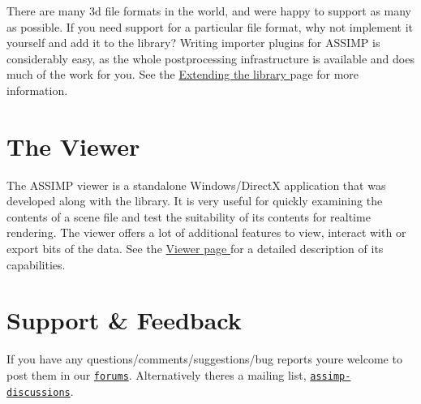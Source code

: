 There are many 3d file formats in the world, and we\textquotesingle{}re happy to support as many as possible. If you need support for a particular file format, why not implement it yourself and add it to the library? Writing importer plugins for A\+S\+S\+I\+M\+P is considerably easy, as the whole postprocessing infrastructure is available and does much of the work for you. See the \hyperlink{extend}{Extending the library } page for more information.\hypertarget{index_main_viewer}{}\section{The Viewer}\label{index_main_viewer}
The A\+S\+S\+I\+M\+P viewer is a standalone Windows/\+Direct\+X application that was developed along with the library. It is very useful for quickly examining the contents of a scene file and test the suitability of its contents for realtime rendering. The viewer offers a lot of additional features to view, interact with or export bits of the data. See the \hyperlink{viewer}{Viewer page } for a detailed description of its capabilities.\hypertarget{index_main_support}{}\section{Support \& Feedback}\label{index_main_support}
If you have any questions/comments/suggestions/bug reports you\textquotesingle{}re welcome to post them in our \href{https://sourceforge.net/forum/forum.php?forum_id=817653}{\tt forums}. Alternatively there\textquotesingle{}s a mailing list, \href{https://sourceforge.net/mailarchive/forum.php?forum_name=assimp-discussions}{\tt assimp-\/discussions}. 